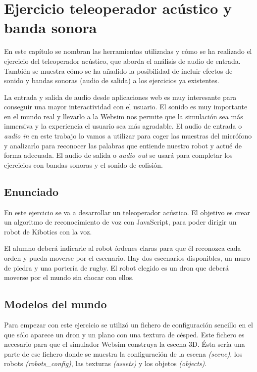 \chapter{Ejercicio teleoperador acústico y banda sonora}\label{audio}
En este capítulo se nombran las herramientas utilizadas y cómo se ha realizado el ejercicio del teleoperador acústico, que aborda el análisis de audio de entrada. También se muestra cómo se ha añadido la posibilidad de incluir efectos de sonido y bandas sonoras (audio de salida) a los ejercicios ya existentes.

La entrada y salida de audio desde aplicaciones web es muy interesante para conseguir una mayor interactividad con el usuario. El sonido es muy importante en el mundo real y llevarlo a la Websim nos permite que la simulación sea más inmersiva y la experiencia el usuario sea más agradable.
 El audio de entrada o \textit{audio in} en este trabajo  lo vamos a utilizar para coger las muestras del micrófono y analizarlo  para reconocer las palabras que entiende nuestro robot y  actué de forma adecuada. El audio de salida o \textit{audio out} se usará para completar los ejercicios con bandas sonoras y el sonido de colisión.

\section{Enunciado}  
En este ejercicio se va a desarrollar un teleoperador acústico. El objetivo es crear un algoritmo de reconocimiento de voz con JavaScript, para poder dirigir un robot de Kibotics con la voz.

El alumno deberá indicarle  al robot órdenes claras para que él reconozca cada orden  y pueda moverse por el escenario. Hay dos escenarios disponibles, un muro de piedra y una portería de rugby. El robot elegido es un dron que deberá moverse por el mundo sin chocar con ellos.

\section{Modelos del mundo }
Para empezar con este ejercicio se utilizó un fichero de configuración sencillo en el que sólo aparece un dron y un plano con una textura de césped. Este fichero es necesario para que el simulador Websim construya la escena 3D. 
Ésta sería una parte de ese fichero donde se muestra la configuración de la escena \textit{(scene)}, los robots \textit {(robots\_config)}, las texturas \textit{(assets)} y los objetos \textit{(objects)}.


